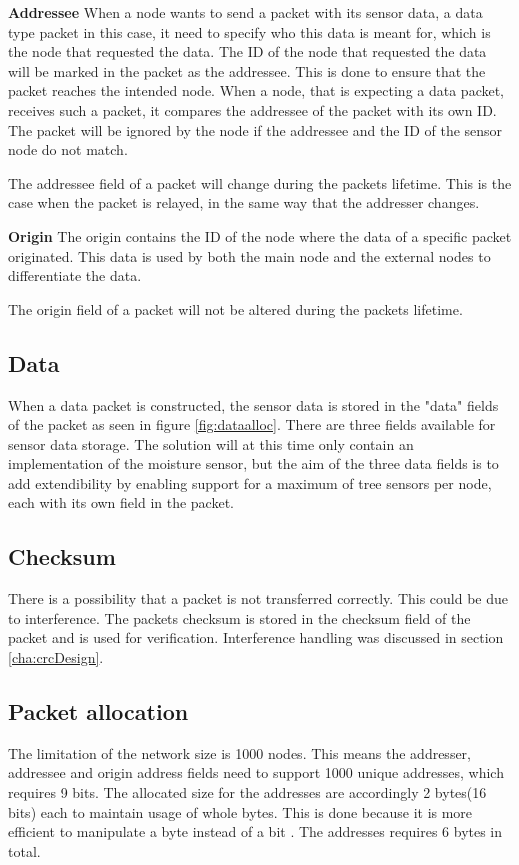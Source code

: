 \textbf{Addressee}\newline
When a node wants to send a packet with its sensor data, a data type packet in this case, it need to specify who this data is meant for, which is the node that requested the data. The ID of the node that requested the data will be marked in the packet as the addressee. This is done to ensure that the packet reaches the intended node. When a node, that is expecting a data packet, receives such a packet, it compares the addressee of the packet with its own ID. The packet will be ignored by the node if the addressee and the ID of the sensor node do not match.

The addressee field of a packet will change during the packets lifetime. This is the case when the packet is relayed, in the same way that the addresser changes.

\textbf{Origin}\newline
The origin contains the ID of the node where the data of a specific packet originated. This data is used by both the main node and the external nodes to differentiate the data.

The origin field of a packet will not be altered during the packets lifetime.


\subsection{Data}
When a data packet is constructed, the sensor data is stored in the "data" fields of the packet as seen in figure \ref{fig:dataalloc}. There are three fields available for sensor data storage. The solution will at this time only contain an implementation of the moisture sensor, but the aim of the three data fields is to add extendibility by enabling support for a maximum of tree sensors per node, each with its own field in the packet.


\subsection{Checksum}
There is a possibility that a packet is not transferred correctly. This could be due to interference. The packets checksum is stored in the checksum field of the packet and is used for verification. Interference handling was discussed in section \ref{cha:crcDesign}.


\subsection{Packet allocation}
The limitation of the network size is 1000 nodes. This means the addresser, addressee and origin address fields need to support 1000 unique addresses, which requires 9 bits. The allocated size for the addresses are accordingly 2 bytes(16 bits) each to maintain usage of whole bytes. This is done because it is more efficient to manipulate a byte instead of a bit \cite{bytevsbit}. The addresses requires 6 bytes in total.

